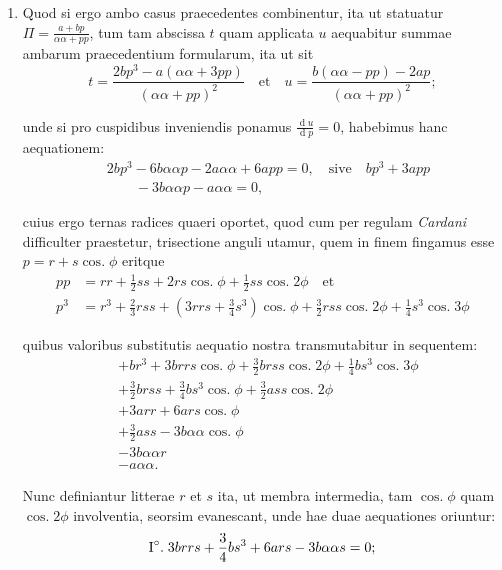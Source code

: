 \documentclass[10pt,a4paper]{article}
\DeclareMathOperator{\cosg}{cos.}
\begin{document}
\begin{paracol}{2}
\begin{enumerate}[topsep=1px]
		\item Quod si ergo ambo casus praecedentes combinentur, ita ut statuatur $\Pi=\frac{a + bp}{\alpha \alpha + pp}$, tum tam abscissa $t$ quam applicata $u$ aequabitur summae ambarum praecedentium formularum, ita ut sit
		\[
			t = \frac{2bp^3 - a(\alpha \alpha + 3pp)}{(\alpha \alpha + pp)^2} \quad \text{et} \quad u = \frac{b(\alpha \alpha - pp)-2ap}{(\alpha \alpha + pp)^2};
		\]
		\par unde si pro cuspidibus inveniendis ponamus $\frac{\operatorname{d}u}{\operatorname{d}p} = 0$, habebimus hanc aequationem:
		\begin{align*}
			&2bp^3-6b\alpha \alpha p -2a \alpha \alpha +6a pp = 0, \quad \text{sive} \quad bp^3+3app\\
			&\qquad-3b\alpha \alpha p - a\alpha \alpha = 0,
		\end{align*}
		\par cuius ergo ternas radices quaeri oportet, quod cum per regulam \textit{Cardani} difficulter praestetur, trisectione anguli utamur, quem in finem fingamus esse $p=r+s\cosg \phi$ eritque
		\begin{align*}
			pp & = rr + \frac{1}{2}ss +2rs \cosg\phi + \frac{1}{2}ss \cosg 2\phi \quad \text{et}\\
			p^3 & = r^3+\frac{2}{3}rss + (3rrs+\frac{3}{4}s^3)\cosg \phi + \frac{3}{2} rss \cosg 2\phi+\frac{1}{4}s^3\cosg 3\phi
		\end{align*}
		\par quibus valoribus substitutis aequatio nostra transmutabitur in sequentem:
		\begin{align*}
			&+br^3+3brrs \cosg \phi + \frac{3}{2}brss \cosg 2\phi+ \frac{1}{4}bs^3\cosg 3\phi\\
			&+\frac{3}{2}brss + \frac{3}{4}bs^3\cosg \phi + \frac{3}{2}ass \cosg 2\phi\\
			&+3arr + 6ars \cosg \phi\\
			&+\frac{3}{2}ass - 3b\alpha \alpha \cosg \phi\\
			&-3b\alpha \alpha r\\
			&-a \alpha \alpha.
		\end{align*}
		\par Nunc definiantur litterae $r$ et $s$ ita, ut membra intermedia, tam $\cosg \phi$ quam $\cosg 2\phi$ involventia, seorsim evanescant, unde hae duae aequationes oriuntur:
		\begin{align*}
			\text{I}\degree.\; &3brrs + \frac{3}{4}bs^3+6ars-3b\alpha \alpha s = 0;\\

\end{align*}
\end{enumerate}
\end{paracol}
\end{document}
